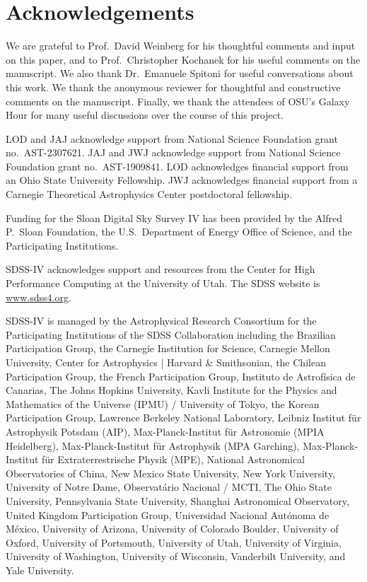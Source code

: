 \documentclass[twocolumn,twocolappendix]{aastex701}
\begin{document}
\section*{Acknowledgements}

We are grateful to Prof.\ David Weinberg for his thoughtful comments and input on this paper, and to Prof.\ Christopher Kochanek for his useful comments on the manuscript. We also thank Dr.\ Emanuele Spitoni for useful conversations about this work. We thank the anonymous reviewer for thoughtful and constructive comments on the manuscript. Finally, we thank the attendees of OSU's Galaxy Hour for many useful discussions over the course of this project.

LOD and JAJ acknowledge support from National Science Foundation grant no.\ AST-2307621. JAJ and JWJ acknowledge support from National Science Foundation grant no.\ AST-1909841.
LOD acknowledges financial support from an Ohio State University Fellowship.
JWJ acknowledges financial support from a Carnegie Theoretical Astrophysics Center postdoctoral fellowship.

Funding for the Sloan Digital Sky 
Survey IV has been provided by the 
Alfred P.\ Sloan Foundation, the U.S.\ 
Department of Energy Office of 
Science, and the Participating 
Institutions. 

SDSS-IV acknowledges support and 
resources from the Center for High 
Performance Computing  at the 
University of Utah. The SDSS 
website is \url{www.sdss4.org}.

SDSS-IV is managed by the 
Astrophysical Research Consortium 
for the Participating Institutions 
of the SDSS Collaboration including 
the Brazilian Participation Group, 
the Carnegie Institution for Science, 
Carnegie Mellon University, Center for 
Astrophysics | Harvard \& 
Smithsonian, the Chilean Participation 
Group, the French Participation Group, 
Instituto de Astrof\'isica de 
Canarias, The Johns Hopkins 
University, Kavli Institute for the 
Physics and Mathematics of the 
Universe (IPMU) / University of 
Tokyo, the Korean Participation Group, 
Lawrence Berkeley National Laboratory, 
Leibniz Institut f\"ur Astrophysik 
Potsdam (AIP),  Max-Planck-Institut 
f\"ur Astronomie (MPIA Heidelberg), 
Max-Planck-Institut f\"ur 
Astrophysik (MPA Garching), 
Max-Planck-Institut f\"ur 
Extraterrestrische Physik (MPE), 
National Astronomical Observatories of 
China, New Mexico State University, 
New York University, University of 
Notre Dame, Observat\'ario 
Nacional / MCTI, The Ohio State 
University, Pennsylvania State 
University, Shanghai 
Astronomical Observatory, United 
Kingdom Participation Group, 
Universidad Nacional Aut\'onoma 
de M\'exico, University of Arizona, 
University of Colorado Boulder, 
University of Oxford, University of 
Portsmouth, University of Utah, 
University of Virginia, University 
of Washington, University of 
Wisconsin, Vanderbilt University, 
and Yale University.
\end{document}
